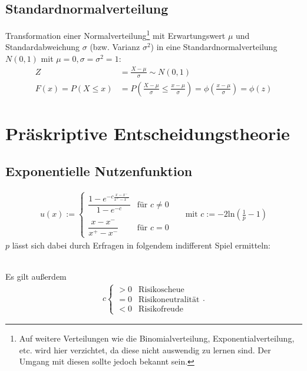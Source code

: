 \documentclass[12pt,a4paper]{scrartcl}
\begin{document}
\subsection{Standardnormalverteilung}
Transformation einer Normalverteilung\footnote{Auf weitere Verteilungen wie die Binomialverteilung, Exponentialverteilung, etc. wird hier verzichtet, da diese nicht auswendig zu lernen sind. Der Umgang mit diesen sollte jedoch bekannt sein.} mit Erwartungswert $ \mu $ und Standardabweichung $ \sigma $ (bzw. Varianz $ \sigma^2 $) in eine Standardnormalverteilung $ N(0,1) $ mit $ \mu = 0, \sigma = \sigma^2 = 1 $:
\begin{align*}
	Z &= \frac{X - \mu}{\sigma} \sim N(0,1)\\
	F(x) = P(X \leq x) &= P\left(\frac{X-\mu}{\sigma} \leq \frac{x-\mu}{\sigma}\right) = \phi \left(\frac{x-\mu}{\sigma}\right) = \phi(z)
\end{align*}

\newpage
\section{Präskriptive Entscheidungstheorie}

\subsection{Exponentielle Nutzenfunktion}
\begin{align*}
	u(x) := \begin{cases}
	\dfrac{1 - e ^{-c\frac{x-x^-}{x^+-x^-}}}{1-e^{-c}} & \text{für } c \neq 0\\\\
	\dfrac{x-x^-}{x^+-x^-} & \text{für } c = 0
	\end{cases} && \text{mit } c := -2\text{ln}\left(\frac{1}{p}-1\right)
\end{align*}
$ p $ lässt sich dabei durch Erfragen in folgendem indifferent Spiel ermitteln:
\begin{figure}[h]
	\centering
\end{figure}\\
Es gilt außerdem
\begin{align*}
c\left\lbrace \begin{array}{cl}
>0 & \text{Risikoscheue}\\
=0 & \text{Risikoneutralität}\\
<0 & \text{Risikofreude}
\end{array}\right. .
\end{align*}
\end{document}
